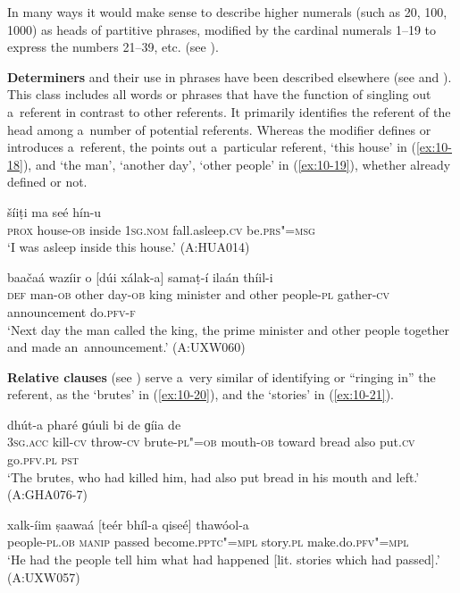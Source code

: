 In many ways it would make sense to describe higher numerals (such as 20, 100, 1000) as heads of partitive phrases, modified by the cardinal numerals 1--19 to express the numbers 21--39, etc. (see ).


\textbf{Determiners} and their use in  phrases have been described elsewhere (see  and ). This class includes all words or phrases that have the function of singling out a~referent in contrast to other referents. It primarily identifies the referent of the  head among a~number of potential referents. Whereas the   modifier defines or introduces a~referent, the  points out a~particular referent, `this house' in (\ref{ex:10-18}), and `the man', `another day', `other people' in (\ref{ex:10-19}), whether already defined or not.

\begin{exe}
\ex
\label{ex:10-18}
 šíiṭi ma seé hín-u\\
\textsc{prox} house-\textsc{ob} inside \textsc{1sg.nom} fall.asleep.\textsc{cv} be.\textsc{prs"=msg} \\
\glt `I was asleep inside this house.' (A:HUA014)

\ex
\label{ex:10-19}
 baačaá wazíir o [dúi xálak-a] samaṭ-í ilaán thíil-i \\
\textsc{def} man-\textsc{ob} other day-\textsc{ob} king minister and other  people-\textsc{pl} gather-\textsc{cv} announcement do.\textsc{pfv-f}  \\
\glt `Next day the man called the king, the prime minister and other people together and made an~announcement.' (A:UXW060)
\end{exe}

\textbf{Relative clauses} (see ) serve a~very similar  of identifying or ``ringing in''
the referent, as the `brutes' in (\ref{ex:10-20}), and the `stories' in (\ref{ex:10-21}).

\begin{exe}
\ex
\label{ex:10-20}
\gll [tas mheer-í ɡal-í zaalim"=aan-óom] dhút-a pharé ɡúuli bi de ɡíia de \\
\textsc{3sg.acc} kill-\textsc{cv} throw-\textsc{cv} brute-\textsc{pl"=ob} mouth-\textsc{ob} toward  bread also put.\textsc{cv} go.\textsc{pfv.pl} \textsc{pst} \\
\glt `The brutes, who had killed him, had also put bread in his mouth and left.' (A:GHA076-7)

\ex
\label{ex:10-21}
\gll xalk-íim ṣaawaá [teér bhíl-a qiseé] thawóol-a \\
people-\textsc{pl.ob} \textsc{manip} passed become.\textsc{pptc"=mpl} story.\textsc{pl} make.do.\textsc{pfv"=mpl} \\
\glt `He had the people tell him what had happened [lit. stories which had passed].' (A:UXW057)
\end{exe}

